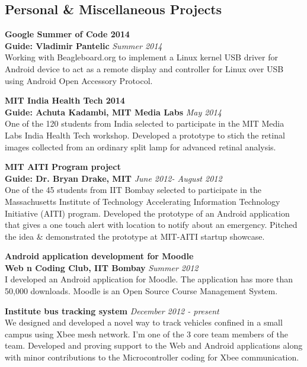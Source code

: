 \documentclass[margin,line]{resume}
\begin{document}
\begin{resume}
\section{\mysidestyle Personal \& Miscellaneous Projects}
\vspace{0mm}

    {\bf Google Summer of Code 2014} \\
    {\bf Guide: Vladimir Pantelic} 	\hfill \textit{Summer 2014} \\   
	Working with Beagleboard.org to implement a Linux kernel USB driver for Android device to act as a remote display and controller for Linux over USB using Android Open Accessory Protocol.
	
    {\bf MIT India Health Tech 2014} \\
    {\bf Guide: Achuta Kadambi, MIT Media Labs} 	\hfill \textit{May 2014} \\   
	One of the 120 students from India selected to participate in the MIT Media Labs India Health Tech workshop. Developed a prototype to stich the retinal images collected from an ordinary split lamp for advanced retinal analysis.
	
    {\bf MIT AITI Program project} \\
    {\bf Guide: Dr. Bryan Drake, MIT} 	\hfill \textit{June 2012- August 2012} \\   
	One of the 45 students from IIT Bombay selected to participate in the  Massachusetts Institute of Technology Accelerating Information Technology Initiative (AITI) program. Developed the prototype of an Android application that gives a one touch alert with location to notify about an emergency. Pitched the idea \& demonstrated the prototype at MIT-AITI startup showcase.
	
	{\bf Android application development for Moodle} \\
    {\bf Web n Coding Club, IIT Bombay} 	                                \hfill \textit{Summer 2012} \\ 
	 I developed an Android application for Moodle. The application has more than 50,000 downloads. Moodle is an Open Source Course Management System.
	
    {\bf Institute bus tracking system} \hfill \textit{December 2012 - present} \\
    We designed and developed a novel way to track vehicles confined in a small campus using Xbee mesh network. I'm one of the 3 core team members of the team. Developed and proving support to the Web and Android applications along with minor contributions to the Microcontroller coding for Xbee communication.
    	

\end{resume}
\end{document}
